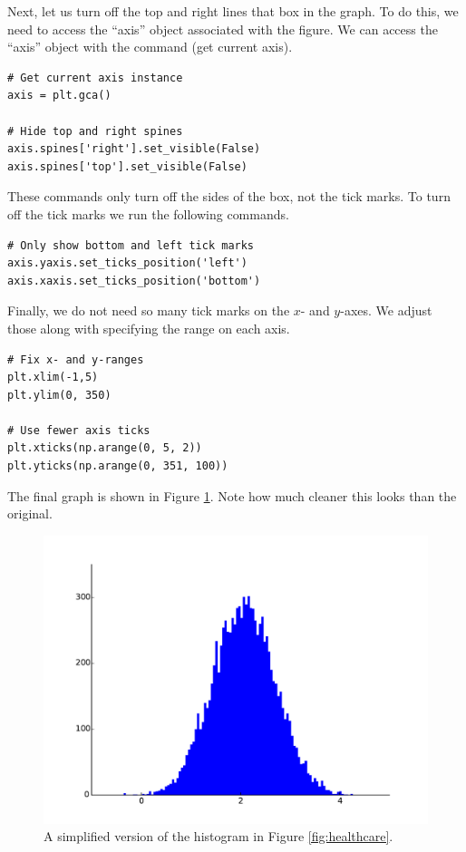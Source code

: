 Next, let us turn off the top and right lines that box in the graph. 
To do this, we need to access the ``axis'' object associated with the figure. 
We can access the ``axis'' object with the command  (get current axis).

\begin{lstlisting}
# Get current axis instance
axis = plt.gca()

# Hide top and right spines
axis.spines['right'].set_visible(False)
axis.spines['top'].set_visible(False)
\end{lstlisting}

These commands only turn off the sides of the box, not the tick marks. 
To turn off the tick marks we run the following commands. 

\begin{lstlisting}
# Only show bottom and left tick marks
axis.yaxis.set_ticks_position('left')
axis.xaxis.set_ticks_position('bottom')
\end{lstlisting}

Finally, we do not need so many tick marks on the $x$- and $y$-axes. 
We adjust those along with specifying the range on each axis.

\begin{lstlisting}
# Fix x- and y-ranges
plt.xlim(-1,5)
plt.ylim(0, 350)

# Use fewer axis ticks
plt.xticks(np.arange(0, 5, 2))
plt.yticks(np.arange(0, 351, 100))
\end{lstlisting}

The final graph is shown in Figure \ref{fig:simplify}. 
Note how much cleaner this looks than the original.

\begin{figure}
\centering
\includegraphics[width=\textwidth]{simplify.pdf}
\caption{A simplified version of the histogram in Figure \ref{fig:healthcare}.}
\label{fig:simplify}
\end{figure}


